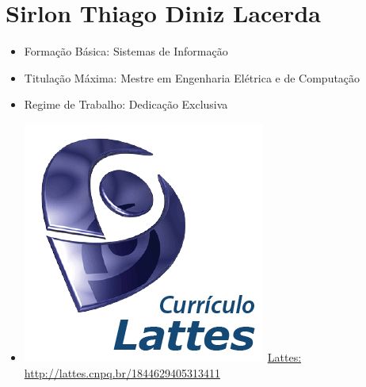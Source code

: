 \documentclass[
	10pt,				%
	openright,			%
	twoside,			%
	a4paper,			%
	english,			%
	french,				%
	brazil,				%
	sumario=tradicional
]{abntex2}
\begin{document}
\section*{Sirlon Thiago Diniz Lacerda}\label{SirlonThiago}
\begin{itemize}
	\item Formação Básica: Sistemas de Informação 
	\item Titulação Máxima: Mestre em Engenharia Elétrica e de Computação
	\item Regime de Trabalho: Dedicação Exclusiva
	\item \includegraphics[scale=.03]{fig/lattes}~\href{http://lattes.cnpq.br/1844629405313411}{Lattes: http://lattes.cnpq.br/1844629405313411}
\end{itemize}
\end{document}
